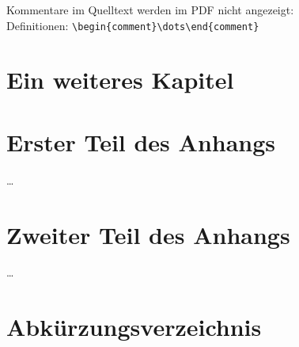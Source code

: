 \documentclass[twoside,bibliography=totoc,openany]{fumi}
\begin{document}
Kommentare im Quelltext werden im PDF nicht angezeigt:\\ Definitionen: \verb|\begin{comment}\dots\end{comment}|


\chapter{Ein weiteres Kapitel}




\appendix

\chapter{Erster Teil des Anhangs}
\dots

\chapter{Zweiter Teil des Anhangs}
\dots




\backmatter
\pagestyle{fancyclear}



{\footnotesize\flushleft\setlength{\itemsep}{-3pt}%

}
\cleardoublepage


\listoffigures
\cleardoublepage


\listoftables
\cleardoublepage


\renewcommand\lstlistlistingname{Verzeichnis der Auflistungen}
\lstlistoflistings
\cleardoublepage


\renewcommand*\listalgorithmcfname{Verzeichnis der Algorithmen}
\listofalgorithms
\cleardoublepage


\chapter*{Abkürzungsverzeichnis}
\end{document}

